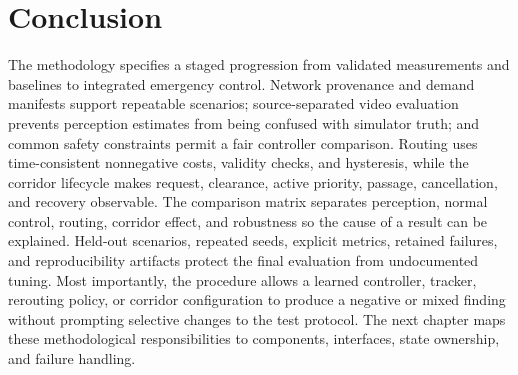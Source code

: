 \section{Conclusion}

The methodology specifies a staged progression from validated measurements and baselines to integrated emergency control. Network provenance and demand manifests support repeatable scenarios; source-separated video evaluation prevents perception estimates from being confused with simulator truth; and common safety constraints permit a fair controller comparison. Routing uses time-consistent nonnegative costs, validity checks, and hysteresis, while the corridor lifecycle makes request, clearance, active priority, passage, cancellation, and recovery observable. The comparison matrix separates perception, normal control, routing, corridor effect, and robustness so the cause of a result can be explained. Held-out scenarios, repeated seeds, explicit metrics, retained failures, and reproducibility artifacts protect the final evaluation from undocumented tuning. Most importantly, the procedure allows a learned controller, tracker, rerouting policy, or corridor configuration to produce a negative or mixed finding without prompting selective changes to the test protocol. The next chapter maps these methodological responsibilities to components, interfaces, state ownership, and failure handling.
